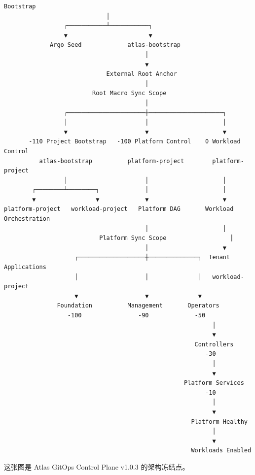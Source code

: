 \documentclass[11pt,a4paper]{article}
\begin{document}
\begin{lstlisting}[language=text]
                         Bootstrap
                             │
                 ┌───────────┴───────────┐
                 ▼                       ▼
             Argo Seed             atlas-bootstrap
                                        │
                                        ▼
                             External Root Anchor
                                        │
                         Root Macro Sync Scope
                                        │
                 ┌──────────────────────┼─────────────────────┐
                 │                      │                     │
                 ▼                      ▼                     ▼
       -110 Project Bootstrap   -100 Platform Control    0 Workload Control
          atlas-bootstrap          platform-project        platform-project
                 │                      │                     │
        ┌────────┴────────┐             │                     │
        ▼                 ▼             ▼                     ▼
platform-project   workload-project   Platform DAG       Workload Orchestration
                                        │                     │
                           Platform Sync Scope                  │
                                        │                     ▼
                    ┌───────────────────┼──────────────┐  Tenant Applications
                    │                   │              │   workload-project
                    ▼                   ▼              ▼
               Foundation          Management       Operators
                  -100                -90             -50
                                                           │
                                                           ▼
                                                      Controllers
                                                         -30
                                                           │
                                                           ▼
                                                   Platform Services
                                                         -10
                                                           │
                                                           ▼
                                                     Platform Healthy
                                                           │
                                                           ▼
                                                     Workloads Enabled
\end{lstlisting}
这张图是 Atlas GitOps Control Plane v1.0.3 的架构冻结点。
\end{document}
